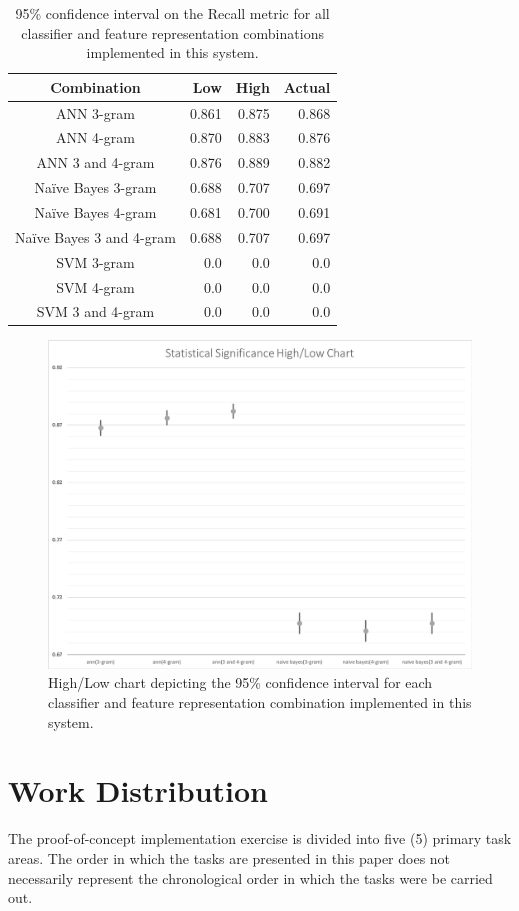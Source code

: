 \documentclass[conference]{sig-alternate-05-2015}
\begin{document}
\begin{table}
  \centering
  \begin{tabular}{| c | r | r | r |}
    \hline
    \textbf{Combination} & \textbf{Low} & \textbf{High} & \textbf{Actual} \\
    \hline\hline
    ANN 3-gram & 0.861 & 0.875 & 0.868 \\
    \hline
    ANN 4-gram & 0.870 & 0.883 & 0.876 \\
    \hline
    ANN 3 and 4-gram & 0.876 & 0.889 & 0.882 \\
    \hline
    Na\"ive Bayes 3-gram & 0.688 & 0.707 & 0.697 \\
    \hline
    Na\"ive Bayes 4-gram & 0.681 & 0.700 & 0.691 \\
    \hline
    Na\"ive Bayes 3 and 4-gram & 0.688 & 0.707 & 0.697 \\
    \hline
    SVM 3-gram & 0.0 & 0.0 & 0.0 \\
    \hline
    SVM 4-gram & 0.0 & 0.0 & 0.0 \\
    \hline
    SVM 3 and 4-gram & 0.0 & 0.0 & 0.0 \\
    \hline
  \end{tabular}
  \caption{95\% confidence interval on the Recall metric for all classifier and
  feature representation combinations implemented in this system.}
  \label{tab:stat_sig}
\end{table}

\begin{figure}[ht!]
  \centering
  \includegraphics[width=.5\textwidth]{statsig_highlow.png}
  \caption{High/Low chart depicting the 95\% confidence interval for each
  classifier and feature representation combination implemented in this system.}
  \label{fig:stat_sig_highlow}
\end{figure}

\section{Work Distribution}\label{sec:plan_roles}
The proof-of-concept implementation exercise is divided into five (5)
primary task areas. The order in which the tasks are presented in this paper
does not necessarily represent the chronological order in which the tasks were
be carried out.
\end{document}
